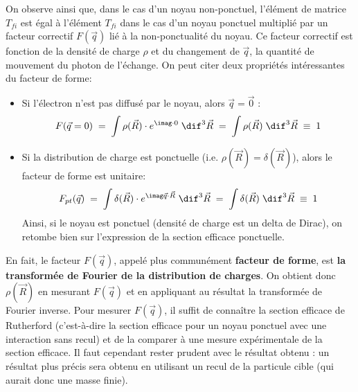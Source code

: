 On observe ainsi que, dans le cas d'un noyau non-ponctuel, l'élément de matrice $T_{fi}$ est égal à l'élément $T_{fi}$ dans le cas d'un noyau ponctuel multiplié par un facteur correctif $F(\vec{q})$ lié à la non-ponctualité du noyau. Ce facteur correctif est fonction de la densité de charge $\rho$ et du changement de $\vec{q}$, la quantité de mouvement du photon de l'échange. On peut citer deux propriétés intéressantes du facteur de forme:
\begin{itemize}
    \item Si l'électron n'est pas diffusé par le noyau, alors $\vec{q}=\vec{0}$ :
          \[
            F(\vec{q}=0) \eq 
            \int \rho(\vec{R}) \cdot e^{\imag\cdot0} \; \dif^3\vec{R} \eq
            \int \rho(\vec{R}) \; \dif^3\vec{R} \;\equiv\; 1
          \]
          
    \item Si la distribution de charge est ponctuelle (i.e. $\rho(\vec{R})= \delta(\vec{R})$), alors le facteur de forme est unitaire:
    \[
        F_{pt}(\vec{q}) \eq 
        \int \delta(\vec{R}) \cdot e^{\imag\vec{q} \cdot\vec{R}} \; \dif^3\vec{R} \eq
        \int \delta(\vec{R}) \; \dif^3\vec{R} \;\equiv\; 1
    \]
    Ainsi, si le noyau est ponctuel (densité de charge est un delta de Dirac), on retombe bien sur l'expression de la section efficace ponctuelle.
\end{itemize}
En fait, le facteur $F(\vec{q})$, appelé plus communément \textbf{facteur de forme}, est \textbf{la transformée de Fourier de la distribution de charges}. On obtient donc $\rho(\vec{R})$ en mesurant $F(\vec{q})$ et en appliquant au résultat la transformée de Fourier inverse. Pour mesurer $F(\vec{q})$, il suffit de connaître la section efficace de Rutherford (c'est-à-dire la section efficace pour un noyau ponctuel avec une interaction sans recul) et de la comparer à une mesure expérimentale de la section efficace. Il faut cependant rester prudent avec le résultat obtenu : un résultat plus précis sera obtenu en utilisant un recul de la particule cible (qui aurait donc une masse finie).\\

